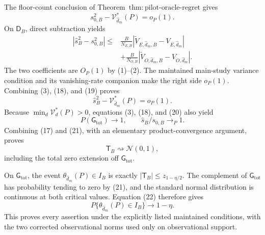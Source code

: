 The floor-count conclusion of Theorem~\(\mathrm{thm{:}pilot\text{-}oracle\text{-}regret}\) gives
\[
 s_{0,B}^2-\mathcal V_{\widehat d_m}^*(P)=o_P(1).              \tag{18}
\]
On \(\mathsf D_B\), direct subtraction yields
\[
\begin{aligned}
 |\widehat s_B^2-s_{0,B}^2|
 \le{}&\frac{B}{N_{E,B}}
 |\widetilde V_{E,\widehat d_m,B}-V_{E,\widehat d_m}|\\
 &+\frac{B}{N_{O,B}}
 |\widetilde V_{O,\widehat d_m,B}-V_{O,\widehat d_m}|.
\end{aligned}                                                   \tag{19}
\]
The two coefficients are \(O_P(1)\) by (1)--(2).  The maintained main-study variance condition and its vanishing-rate companion make the right side \(o_P(1)\).  Combining (3), (18), and (19) proves
\[
 \widehat s_B^2-\mathcal V_{\widehat d_m}^*(P)=o_P(1).         \tag{20}
\]
Because \(\min_d\mathcal V_d^*(P)>0\), equations (3), (18), and (20) also yield
\[
 P(\mathsf G_{\mathrm{tot}})\longrightarrow1,
 \qquad \widehat s_B/s_{0,B}\longrightarrow_P1.              \tag{21}
\]
Combining (17) and (21), with an elementary product-convergence argument, proves
\[
 \mathsf T_B\rightsquigarrow\mathcal N(0,1),                  \tag{22}
\]
including the total zero extension off \(\mathsf G_{\mathrm{tot}}\).

On \(\mathsf G_{\mathrm{tot}}\), the event \(\theta_{\widehat d_m}(P)\in I_B\) is exactly \(|\mathsf T_B|\le z_{1-\eta/2}\).  The complement of \(\mathsf G_{\mathrm{tot}}\) has probability tending to zero by (21), and the standard normal distribution is continuous at both critical values.  Equation (22) therefore gives
\[
 P\{\theta_{\widehat d_m}(P)\in I_B\}\longrightarrow1-\eta.
\]
This proves every assertion under the explicitly listed maintained conditions, with the two corrected observational norms used only on observational support.